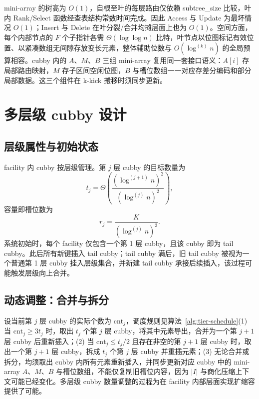 mini-array 的树高为 \(O(1)\)，自根至叶的每层路由仅依赖 subtree\_size 比较，叶内 Rank/Select 函数经查表结构常数时间完成\cite{jacobson1989,pagh2008retrieval}。因此 Access 与 Update 为最坏情况 \(O(1)\)；Insert 与 Delete 在叶分裂/合并均摊层面上也为 \(O(1)\)\cite{bayer1972,bender2022otsh}。空间方面，每个内部节点的 \(F\) 个子指针各需 \(\Theta(\log\log n)\) 比特，叶节点以位图标记有效位置、以紧凑数组无间隙存放变长元素，整体辅助位数与 \(O(\log^{(k)}n)\) 的全局预算相容\cite{kurpicz2023pachash,lehmann2024shockhash}。cubby 内的 \(A\)、\(M\)、\(B\) 三组 mini-array 复用同一套接口语义：\(A[i]\) 存局部路由映射，\(M\) 存子区间空闲位图，\(B\) 与槽位数组一一对应存差分编码和部分局部数据。这三个组件在 k-kick 搬移时须同步更新。

\section{多层级 cubby 设计}

\subsection{层级属性与初始状态}

facility 内 cubby 按层级管理。第 \(j\) 层 cubby 的目标数量为
\begin{equation}
  t_j=\Theta\!\left(\frac{(\log^{(j+1)}n)^2}{(\log^{(j)}n)^2}\right),
\end{equation}
容量即槽位数为
\begin{equation}
  r_j=\frac{K}{(\log^{(j)}n)^2}.
\end{equation}
系统初始时，每个 facility 仅包含一个第 1 层 cubby，且该 cubby 即为 tail cubby。此后所有新键插入 tail cubby；tail cubby 满后，旧 tail cubby 被视为一个普通第 1 层 cubby 挂入层级集合，并新建 tail cubby 承接后续插入，该过程可能触发层级向上合并\cite{bender2022otsh,bender2024sosa,bender2024iceberg,pandey2023iceberght}。

\subsection{动态调整：合并与拆分}

设当前第 \(j\) 层 cubby 的实际个数为 \(\mathrm{cnt}_j\)，调度规则见算法~\ref{alg:tier-schedule}(1) 当 \(\mathrm{cnt}_j\ge 3t_j\) 时，取出 \(t_j\) 个第 \(j\) 层 cubby，将其中元素导出，合并为一个第 \(j+1\) 层 cubby 后重新插入；(2) 当 \(\mathrm{cnt}_j\le t_j/2\) 且存在非空的第 \(j+1\) 层 cubby 时，取出一个第 \(j+1\) 层 cubby，拆成 \(t_j\) 个第 \(j\) 层 cubby 并重插元素；(3) 无论合并或拆分，均须取出 cubby 内所有元素重新插入，并同步更新对应 cubby 中的 mini-array \(A\)、\(M\)、\(B\) 与槽位数组，不能仅复制旧槽位内容，因为 \(|I|\) 与商化压缩上下文可能已经变化\cite{bender2022otsh,conway2018,kuszmaul2024filters}。多层级 cubby 数量调整的过程为在 facility 内部层面实现扩缩容提供了可能。

